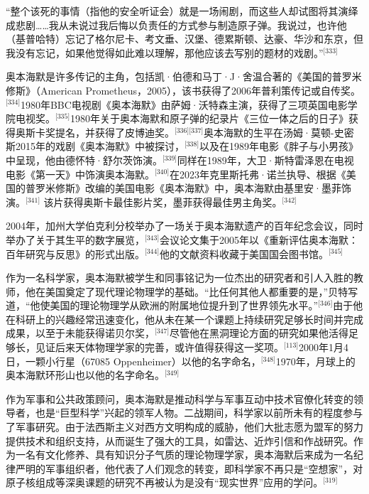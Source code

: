 “整个该死的事情（指他的安全听证会）就是一场闹剧，而这些人却试图将其演绎成悲剧……我从未说过我后悔以负责任的方式参与制造原子弹。我说过，也许他（基普哈特）忘记了格尔尼卡、考文垂、汉堡、德累斯顿、达豪、华沙和东京，但我没有忘记，如果他觉得如此难以理解，那他应该去写别的题材的戏剧。”\(^\text{[333]}\)

奥本海默是许多传记的主角，包括凯·伯德和马丁·J·舍温合著的《美国的普罗米修斯》（American Prometheus，2005），该书获得了2006年普利策传记或自传奖。\(^\text{[334]}\)1980年BBC电视剧《奥本海默》由萨姆·沃特森主演，获得了三项英国电影学院电视奖。\(^\text{[335]}\)1980年关于奥本海默和原子弹的纪录片《三位一体之后的日子》获得奥斯卡奖提名，并获得了皮博迪奖。\(^\text{[336][337]}\)奥本海默的生平在汤姆·莫顿-史密斯2015年的戏剧《奥本海默》中被探讨，\(^\text{[338]}\)以及在1989年电影《胖子与小男孩》中呈现，他由德怀特·舒尔茨饰演。\(^\text{[339]}\)同样在1989年，大卫·斯特雷泽恩在电视电影《第一天》中饰演奥本海默。\(^\text{[340]}\)在2023年克里斯托弗·诺兰执导、根据《美国的普罗米修斯》改编的美国电影《奥本海默》中，奥本海默由基里安·墨菲饰演。\(^\text{[341]}\) 该片获得奥斯卡最佳影片奖，墨菲获得最佳男主角奖。\(^\text{[342]}\)

2004年，加州大学伯克利分校举办了一场关于奥本海默遗产的百年纪念会议，同时举办了关于其生平的数字展览，\(^\text{[343]}\)会议论文集于2005年以《重新评估奥本海默：百年研究与反思》的形式出版。\(^\text{[344]}\)他的文献资料收藏于美国国会图书馆。\(^\text{[345]}\)

作为一名科学家，奥本海默被学生和同事铭记为一位杰出的研究者和引人入胜的教师，他在美国奠定了现代理论物理学的基础。“比任何其他人都重要的是，”贝特写道，“他使美国的理论物理学从欧洲的附属地位提升到了世界领先水平。”\(^\text{[346]}\)由于他在科研上的兴趣经常迅速变化，他从未在某一个课题上持续研究足够长时间并完成成果，以至于未能获得诺贝尔奖，\(^\text{[347]}\)尽管他在黑洞理论方面的研究如果他活得足够长，见证后来天体物理学家的完善，或许值得获得这一奖项。\(^\text{[113]}\)2000年1月4日，一颗小行星（67085 Oppenheimer）以他的名字命名，\(^\text{[348]}\)1970年，月球上的奥本海默环形山也以他的名字命名。\(^\text{[349]}\)

作为军事和公共政策顾问，奥本海默是推动科学与军事互动中技术官僚化转变的领导者，也是“巨型科学”兴起的领军人物。二战期间，科学家以前所未有的程度参与了军事研究。由于法西斯主义对西方文明构成的威胁，他们大批志愿为盟军的努力提供技术和组织支持，从而诞生了强大的工具，如雷达、近炸引信和作战研究。作为一名有文化修养、具有知识分子气质的理论物理学家，奥本海默后来成为一名纪律严明的军事组织者，他代表了人们观念的转变，即科学家不再只是“空想家”，对原子核组成等深奥课题的研究不再被认为是没有“现实世界”应用的学问。\(^\text{[319]}\)

